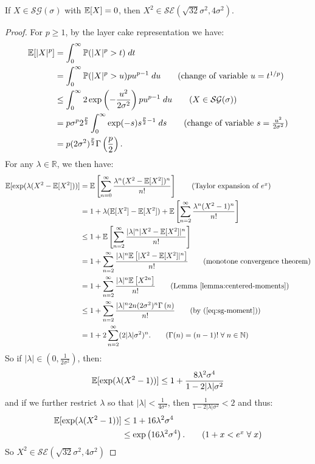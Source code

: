 \begin{lemma}\label{lemma:squared-sub-gaussian}
    If $X \in \mathcal{SG}(\sigma)$ with $\mathbb{E}[X] = 0$, then $X^2 \in \mathcal{SE}(\sqrt{32}\sigma^2, 4\sigma^2).$
\end{lemma}

\begin{proof}
For $p \geq 1$, by the layer cake representation we have:
\begin{align}
    \E[|X|^p] &= \int_0^\infty \Pr(|X|^p > t) \; dt \notag \\
    &= \int_0^\infty \Pr(|X|^p > u) pu^{p-1}\; du  \tag{change of variable $u = t^{1/p}$} \\
    &\leq \int_0^\infty 2\exp\left(-\frac{u^2}{2\sigma^2}\right)pu^{p-1}\; du \tag{$X\in\mathcal{SG}(\sigma)$} \\
    &= p\sigma^p2^{\frac{p}{2}}\int_0^\infty \exp(-s)s^{\frac{p}{2}-1}\;ds \tag{change of variable $s = \frac{u^2}{2\sigma^2}$} \\
    &= p(2\sigma^2)^{\frac{p}{2}}\Gamma\left(\frac{p}{2}\right). \label{eq:sg-moment}
\end{align}
For any $\lambda \in \mathbb{R}$, we then have:
\begin{align*}
    \E[\exp(\lambda (X^2-\E[X^2]))] &= \E\left[\sum_{n=0}^{\infty} \frac{\lambda^n (X^2-\E[X^2])^n}{n!}\right] \tag{Taylor expansion of $e^x$} \\
    &= 1 + \lambda(\E[X^2] - \E[X^2]) + \E\left[\sum_{n=2}^{\infty} \frac{\lambda^n (X^2-1)^n}{n!}\right] \\ 
    &\leq  1 + \E\left[\sum_{n=2}^{\infty} \frac{|\lambda|^n |X^2-\E[X^2]|^n}{n!}\right] \\
    &= 1 + \sum_{n=2}^{\infty} \frac{|\lambda|^n \E\left[|X^{2} - \E[X^2]|^n\right]}{n!}\tag{monotone convergence theorem} \\
    &= 1 + \sum_{n=2}^{\infty} \frac{|\lambda|^n \E\left[X^{2n}\right]}{n!}\tag{Lemma \ref{lemma:centered-moments}} \\
    &\leq 1 + \sum_{n=2}^{\infty} \frac{|\lambda|^n 2n(2\sigma^2)^n\Gamma\left(n\right)}{n!}\tag{by (\ref{eq:sg-moment})} \\
    &= 1 + 2 \sum_{n=2}^{\infty} (2|\lambda|\sigma^{2})^n. \tag{$\Gamma(n) = (n-1)! \sforall n \in \mathbb{N}$} \\
\end{align*}
So if $|\lambda| \in \left(0, \frac{1}{2\sigma^2}\right)$, then: 
\begin{align*}
    \mathbb{E}[\exp(\lambda (X^2-1))] \leq 1 + \frac{8\lambda^2\sigma^4}{1 - 2|\lambda|\sigma^{2}}
\end{align*}
and if we further restrict $\lambda$ so that $|\lambda| < \frac{1}{4\sigma^2}$, then $\frac{1}{1 - 2|\lambda|\sigma^2} < 2$ and thus:
\begin{align*}
    \E[\exp(\lambda (X^2-1))] &\leq 1 + 16\lambda^2\sigma^4 \\
    &\leq \exp\left(16\lambda^2\sigma^4\right). \tag{$1+x < e^x \sforall x$}
\end{align*}
So $X^2 \in \mathcal{SE}(\sqrt{32}\sigma^2, 4\sigma^2)$
\end{proof}


